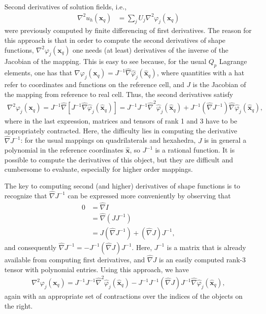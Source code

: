 \documentclass{ansarticle-preprint}
\begin{document}
Second derivatives of solution fields, i.e.,
\begin{align*}
  \nabla^2 u_h(\mathbf x_q) &= \sum_{j} U_j \nabla^2\varphi_j(\mathbf x_q)
\end{align*}
were previously computed by finite differencing of first
derivatives. The reason for this approach is that in order to compute
the second derivatives of shape functions, $\nabla^2\varphi_j(\mathbf
x_q)$ one needs (at least) derivatives of the inverse of the Jacobian of the
mapping. This is easy to see because, for the usual $Q_p$ Lagrange
elements, one has that $\nabla\varphi_j(\mathbf
x_q)=J^{-1}\hat\nabla\hat\varphi_j(\hat{\mathbf x}_q)$, where quantities
with a hat refer to coordinates and functions on the reference cell,
and $J$ is the Jacobian of the mapping from reference to real
cell. Thus, the second derivatives satisfy
\begin{align*}
  \nabla^2\varphi_j(\mathbf x_q)
  =
  J^{-1}\hat\nabla\left[J^{-1}\hat\nabla\hat\varphi_j(\hat{\mathbf x}_q)\right]
  =
  J^{-1} J^{-1}\hat\nabla^2\hat\varphi_j(\hat{\mathbf x}_q)
  +
  J^{-1}\left(\hat\nabla J^{-1}\right)\hat\nabla\hat\varphi_j(\hat{\mathbf x}_q),
\end{align*}
where in the last expression, matrices and tensors of rank 1 and 3
have to be appropriately contracted.  Here, the difficulty lies in
computing the derivative $\hat\nabla J^{-1}$: for the usual mappings
on quadrilaterals and hexahedra, $J$ is in general a polynomial in the
reference coordinates $\hat {\mathbf x}$, so $J^{-1}$ is a rational
function. It is possible to compute the derivatives of this object,
but they are difficult and cumbersome to evaluate, especially for
higher order mappings.

The key to computing second (and higher) derivatives of shape
functions is to recognize that $\hat\nabla J^{-1}$ can be expressed
more conveniently by observing that
\begin{align*}
  0 &= \hat\nabla I
  \\
  &= \hat\nabla (JJ^{-1})
  \\
  &= J (\hat\nabla J^{-1}) + (\hat\nabla J) J^{-1},
\end{align*}
and consequently $\hat\nabla J^{-1} = - J^{-1} (\hat\nabla J)
J^{-1}$. Here, $J^{-1}$ is a matrix that is already available from
computing first derivatives, and $\hat\nabla J$ is an easily computed
rank-3 tensor with polynomial entries. Using this approach, we have
\begin{align*}
  \nabla^2\varphi_j(\mathbf x_q)
  =
  J^{-1} J^{-1}\hat\nabla^2\hat\varphi_j(\hat{\mathbf x}_q)
  -
  J^{-1} J^{-1} (\hat\nabla J)
  J^{-1}\hat\nabla\hat\varphi_j(\hat{\mathbf x}_q),
\end{align*}
again with an appropriate set of contractions over the indices of the
objects on the right.
\end{document}
